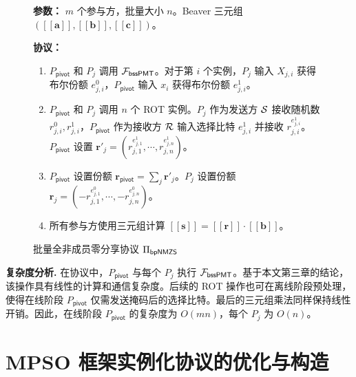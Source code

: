 \begin{figure}[!htb]
\begin{framed}
\begin{minipage}[c]{\textwidth}
\begin{trivlist}
\item \textbf{参数：} $m$ 个参与方，批量大小 $n$。Beaver 三元组 $([\! [ \textbf{a} ] \!], [\! [ \textbf{b} ] \!], [\! [ \textbf{c} ] \!])$。
\item \textbf{协议：}
\begin{enumerate}[itemsep=2pt,topsep=0pt,parsep=0pt,leftmargin=15pt]
\item $P_\mathsf{pivot}$ 和 $P_j$ 调用 $\mathcal{F}_\mathsf{bssPMT}$。对于第 $i$ 个实例，$P_j$ 输入 $X_{j,i}$ 获得布尔份额 $e_{j,i}^0$，$P_\mathsf{pivot}$ 输入 $x_i$ 获得布尔份额 $e_{j,i}^1$。 
\item $P_\mathsf{pivot}$ 和 $P_j$ 调用 $n$ 个 ROT 实例。$P_j$ 作为发送方 $\mathcal{S}$ 接收随机数 $r_{j,i}^0,r_{j,i}^1$，$P_\mathsf{pivot}$ 作为接收方 $\mathcal{R}$ 输入选择比特 $e_{j,i}^1$ 并接收 $r_{j,i}^{e_{j,i}^1}$。$P_\mathsf{pivot}$ 设置 $\textbf{r}'_{j} = (r_{j,1}^{e_{j,1}^1},\cdots,r_{j,n}^{e_{j,n}^1})$。 
\item $P_\mathsf{pivot}$ 设置份额 $\textbf{r}_{\mathsf{pivot}} = \sum_{j} \textbf{r}'_{j}$。$P_j$ 设置份额 $\textbf{r}_{j} = (-r_{j,1}^{e_{j,1}^0}, \cdots, -r_{j,n}^{e_{j,n}^0})$。
\item 所有参与方使用三元组计算 $[\! [ \textbf{s} ] \!] = [\! [ \textbf{r} ] \!] \cdot [\! [ \textbf{b} ] \!]$。
\end{enumerate}
\end{trivlist}
\end{minipage}
\end{framed}
\caption{批量全非成员零分享协议 $\Pi_\mathsf{bpNMZS}$}\label{fig:proto-bpnmzs}
\end{figure}

\begin{trivlist}
\item \textbf{复杂度分析.} 在协议中，$P_\mathsf{pivot}$ 与每个 $P_j$ 执行 $\mathcal{F}_\mathsf{bssPMT}$。基于本文第三章的结论，该操作具有线性的计算和通信复杂度。后续的 ROT 操作也可在离线阶段预处理，使得在线阶段 $P_\mathsf{pivot}$ 仅需发送掩码后的选择比特。最后的三元组乘法同样保持线性开销。因此，在线阶段 $P_\mathsf{pivot}$ 的复杂度为 $O(mn)$，每个 $P_j$ 为 $O(n)$。
\end{trivlist}

\section{MPSO 框架实例化协议的优化与构造}

